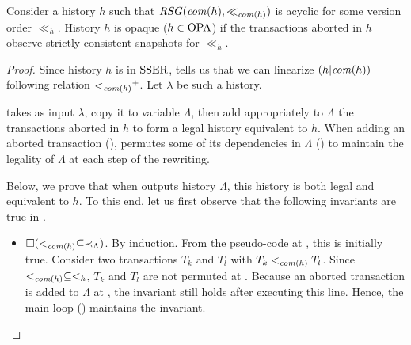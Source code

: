 \begin{proposition}
  Consider a history $h$ such that $\RSG(\committed{h},\ll_{\committed{h}})$ is acyclic for some version order $\ll_h$.
  History $h$ is opaque ($h \in \OPA$) if the transactions aborted in $h$ observe strictly consistent snapshots for $\ll_h$.
\end{proposition}

\begin{proof}
  
  Since history $h$ is in $\SSER$,  tells us that we can linearize $(h|\committed{h})$ following relation $\closureOf{<_{\committed{h}}}$.
  Let $\lambda$ be such a history.

   takes as input $\lambda$, copy it to variable $\Lambda$, then add appropriately to $\Lambda$ the transactions aborted in $h$ to form a legal history equivalent to $h$.
  When adding an aborted transaction (),  permutes some of its dependencies in $\Lambda$ () to maintain the legality of $\Lambda$ at each step of the rewriting.

  Below, we prove that when  outputs history $\Lambda$, this history is both legal and equivalent to $h$.
  To this end, let us first observe that the following invariants are true in .  
  \begin{itemize}

  \item $\tlGlobally(<_{\committed{h}} \subseteq \hb_{\Lambda})$.
    By induction.
    From the pseudo-code at , this is initially true.
    Consider two transactions $T_k$ and $T_l$ with $T_k <_{\committed{h}} T_l$.
    Since $<_{\committed{h}} \subseteq <_h$, $T_k$ and $T_l$ are not permuted at .
    Because an aborted transaction is added to $\Lambda$ at , the invariant still holds after executing this line.
    Hence, the main loop () maintains the invariant.


\end{itemize}
\end{proof}
